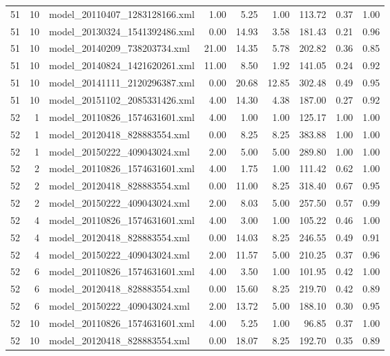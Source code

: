 \begin{table}[ht]
\begin{tabular}{rrlrrrrrr}
   51 &  10 & model\_20110407\_1283128166.xml & 1.00 & 5.25 & 1.00 & 113.72 & 0.37 & 1.00 \\ 
   51 &  10 & model\_20130324\_1541392486.xml & 0.00 & 14.93 & 3.58 & 181.43 & 0.21 & 0.96 \\ 
   51 &  10 & model\_20140209\_738203734.xml & 21.00 & 14.35 & 5.78 & 202.82 & 0.36 & 0.85 \\ 
   51 &  10 & model\_20140824\_1421620261.xml & 11.00 & 8.50 & 1.92 & 141.05 & 0.24 & 0.92 \\ 
   51 &  10 & model\_20141111\_2120296387.xml & 0.00 & 20.68 & 12.85 & 302.48 & 0.49 & 0.95 \\ 
   51 &  10 & model\_20151102\_2085331426.xml & 4.00 & 14.30 & 4.38 & 187.00 & 0.27 & 0.92 \\ 
   52 &   1 & model\_20110826\_1574631601.xml & 4.00 & 1.00 & 1.00 & 125.17 & 1.00 & 1.00 \\ 
   52 &   1 & model\_20120418\_828883554.xml & 0.00 & 8.25 & 8.25 & 383.88 & 1.00 & 1.00 \\ 
   52 &   1 & model\_20150222\_409043024.xml & 2.00 & 5.00 & 5.00 & 289.80 & 1.00 & 1.00 \\ 
   52 &   2 & model\_20110826\_1574631601.xml & 4.00 & 1.75 & 1.00 & 111.42 & 0.62 & 1.00 \\ 
   52 &   2 & model\_20120418\_828883554.xml & 0.00 & 11.00 & 8.25 & 318.40 & 0.67 & 0.95 \\ 
   52 &   2 & model\_20150222\_409043024.xml & 2.00 & 8.03 & 5.00 & 257.50 & 0.57 & 0.99 \\ 
   52 &   4 & model\_20110826\_1574631601.xml & 4.00 & 3.00 & 1.00 & 105.22 & 0.46 & 1.00 \\ 
   52 &   4 & model\_20120418\_828883554.xml & 0.00 & 14.03 & 8.25 & 246.55 & 0.49 & 0.91 \\ 
   52 &   4 & model\_20150222\_409043024.xml & 2.00 & 11.57 & 5.00 & 210.25 & 0.37 & 0.96 \\ 
   52 &   6 & model\_20110826\_1574631601.xml & 4.00 & 3.50 & 1.00 & 101.95 & 0.42 & 1.00 \\ 
   52 &   6 & model\_20120418\_828883554.xml & 0.00 & 15.60 & 8.25 & 219.70 & 0.42 & 0.89 \\ 
   52 &   6 & model\_20150222\_409043024.xml & 2.00 & 13.72 & 5.00 & 188.10 & 0.30 & 0.95 \\ 
   52 &  10 & model\_20110826\_1574631601.xml & 4.00 & 5.25 & 1.00 & 96.85 & 0.37 & 1.00 \\ 
   52 &  10 & model\_20120418\_828883554.xml & 0.00 & 18.07 & 8.25 & 192.70 & 0.35 & 0.89 \\ 

\end{tabular}
\end{table}
